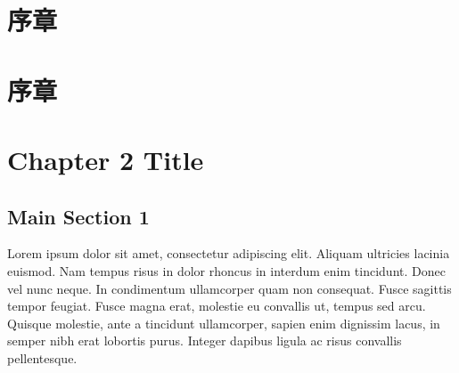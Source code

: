\documentclass[
  letterpaper,
  11pt,
  english,
  singlespacing,
  headsepline,
  japanese,
  oneside]{MastersDoctoralThesis}
\begin{document}




\dedicatory{} 



\mainmatter %

\pagestyle{thesis} %
\newcommand{\keyword}[1]{\textbf{#1}}
\newcommand{\tabhead}[1]{\textbf{#1}}
\newcommand{\code}[1]{\texttt{#1}}
\newcommand{\file}[1]{\texttt{\bfseries#1}}
\newcommand{\option}[1]{\texttt{\itshape#1}}



\chapter{序章}\label{sec-Chapter1}


\chapter{序章}\label{sec-Chapter1}


\chapter{Chapter 2 Title}\label{sec-Chapter2}

\section{Main Section 1}\label{main-section-1}

Lorem ipsum dolor sit amet, consectetur adipiscing elit. Aliquam
ultricies lacinia euismod. Nam tempus risus in dolor rhoncus in interdum
enim tincidunt. Donec vel nunc neque. In condimentum ullamcorper quam
non consequat. Fusce sagittis tempor feugiat. Fusce magna erat, molestie
eu convallis ut, tempus sed arcu. Quisque molestie, ante a tincidunt
ullamcorper, sapien enim dignissim lacus, in semper nibh erat lobortis
purus. Integer dapibus ligula ac risus convallis pellentesque.
\end{document}
